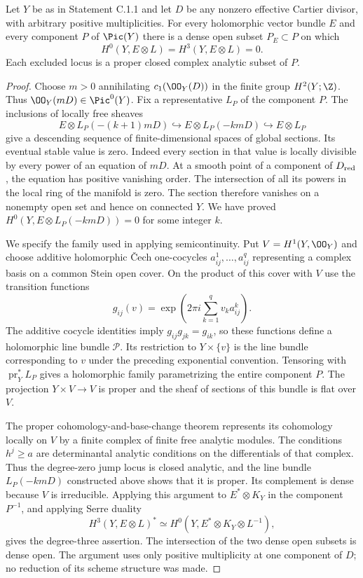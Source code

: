 \begin{proposition}[C.1.2; Proved]\label{st:C.1.2}
Let $Y$ be as in Statement C.1.1 and let $D$ be any nonzero effective
Cartier divisor, with arbitrary positive multiplicities. For every
holomorphic vector bundle $E$ and every component $P$ of $\Pic(Y)$ there
is a dense open subset $P_E\subset P$ on which
\[
 H^0(Y,E\otimes L)=H^3(Y,E\otimes L)=0.
\]
Each excluded locus is a proper closed complex analytic subset of $P$.
\end{proposition}
\begin{proof}
Choose $m>0$ annihilating $c_1(\OO_Y(D))$ in the finite group
$H^2(Y;\Z)$. Thus $\OO_Y(mD)\in\Pic^0(Y)$. Fix a representative $L_P$
of the component $P$. The inclusions of locally free sheaves
\[
 E\otimes L_P(-(k+1)mD)\hookrightarrow E\otimes L_P(-kmD)
 \hookrightarrow E\otimes L_P
\]
give a descending sequence of finite-dimensional spaces of global
sections. Its eventual stable value is zero. Indeed every section in
that value is locally divisible by every power of an equation of
$mD$. At a smooth point of a component of $D_{\rm red}$, the equation
has positive vanishing order. The intersection of all its powers in
the local ring of the manifold is zero. The section therefore vanishes
on a nonempty open set and hence on connected $Y$. We have proved
$H^0(Y,E\otimes L_P(-kmD))=0$ for some integer $k$.

We specify the family used in applying semicontinuity. Put
$V=H^1(Y,\OO_Y)$ and choose additive holomorphic \v Cech
one-cocycles $a^1_{ij},\ldots,a^q_{ij}$ representing a complex basis
on a common Stein open cover. On the product of this cover with $V$
use the transition functions
\[
 g_{ij}(v)=\exp\left(2\pi i\sum_{k=1}^q v_k a^k_{ij}\right).
\]
The additive cocycle identities imply $g_{ij}g_{jk}=g_{ik}$,
so these functions define a holomorphic line bundle $\mathscr P$.
Its restriction to $Y\times\{v\}$ is the line bundle
corresponding to $v$ under the preceding exponential convention.
Tensoring with $\operatorname{pr}_Y^*L_P$ gives a holomorphic family
parametrizing the entire component $P$. The projection
$Y\times V\to V$ is proper and the sheaf of sections of this bundle
is flat over $V$.

The proper cohomology-and-base-change theorem represents its cohomology
locally on $V$ by a finite complex of finite free analytic modules.
The conditions $h^j\geq a$ are determinantal analytic conditions on
the differentials of that complex. Thus the degree-zero jump locus is
closed analytic, and the line bundle $L_P(-kmD)$ constructed above
shows that it is proper. Its complement is dense because $V$ is
irreducible. Applying this argument to $E^*\otimes K_Y$ in the
component $P^{-1}$, and applying Serre duality
\[
 H^3(Y,E\otimes L)^*
 \simeq H^0(Y,E^*\otimes K_Y\otimes L^{-1}),
\]
gives the degree-three assertion. The intersection of the two dense
open subsets is dense open. The argument uses only positive
multiplicity at one component of $D$; no reduction of its scheme
structure was made.
\end{proof}



